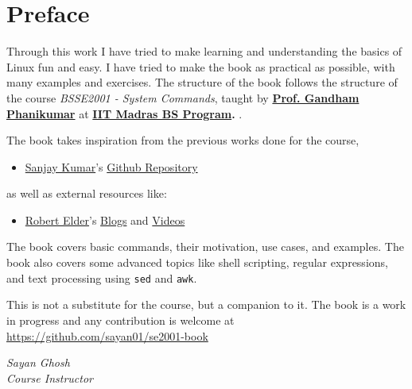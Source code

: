 \chapter*{Preface}

Through this work I have tried to make learning and
understanding the basics of Linux fun and easy. I have
tried to make the book as practical as possible, with
many examples and exercises. The structure of the book
follows the structure of the course \textit{BSSE2001
- System Commands}, taught by
\textbf{
\href{https://home.iitm.ac.in/gphani/}{Prof. Gandham Phanikumar}
}
at
\textbf{
\href{https://study.iitm.ac.in/ds/}{IIT Madras BS Program}.
}.

The book takes inspiration from the previous works done for the course,

\begin{itemize}
	\item \href{https://github.com/prassr}{Sanjay Kumar}'s
	\href{https://github.com/prassr/gnu-linux-commands}{Github Repository}
\end{itemize}

as well as external resources like:

\begin{itemize}
	\item \href{https://www.robertelder.org/}{Robert Elder}'s
	\href{https://blog.robertelder.org/}{Blogs} and
	\href{https://www.youtube.com/@RobertElderSoftware/shorts}{Videos}
\end{itemize}

The book covers basic commands, their motivation, use cases, and examples.
The book also covers some advanced topics like shell scripting, 
regular expressions, and text processing using \texttt{sed} and \texttt{awk}.

This is not a substitute for the course, but a companion to it.
The book is a work in progress and any contribution is welcome at
\url{https://github.com/sayan01/se2001-book}

\begin{flushright}
	\textit{Sayan Ghosh}
	\\
	\textit{Course Instructor}
\end{flushright}
